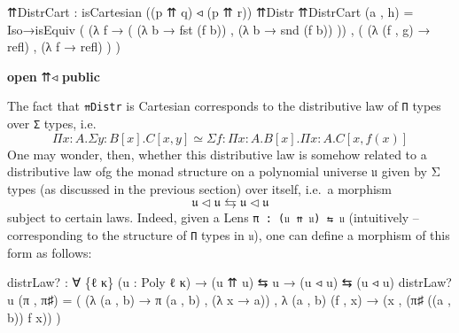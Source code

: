 \documentclass[
  11pt,
  oneside,
  article]{memoir}
\newenvironment{Shaded}{}{}
\newcommand{\KeywordTok}[1]{\textcolor[rgb]{0.00,0.44,0.13}{\textbf{#1}}}
\newcommand{\NormalTok}[1]{#1}
\newcommand{\OtherTok}[1]{\textcolor[rgb]{0.00,0.44,0.13}{#1}}
\theoremstyle{definition}
\theoremstyle{plain}
\newcommand{\0}{\textsf{0}}
\newcommand{\1}{\tn{\textsf{1}}}
\begin{document}
\begin{Shaded}
\begin{Highlighting}[]
\NormalTok{    ⇈DistrCart }\OtherTok{:}\NormalTok{ isCartesian }\OtherTok{((}\NormalTok{p ⇈ q}\OtherTok{)}\NormalTok{ ◃ }\OtherTok{(}\NormalTok{p ⇈ r}\OtherTok{))}\NormalTok{ ⇈Distr}
\NormalTok{    ⇈DistrCart }\OtherTok{(}\NormalTok{a , h}\OtherTok{)} \OtherTok{=}
\NormalTok{        Iso→isEquiv }\OtherTok{(} \OtherTok{(λ}\NormalTok{ f }\OtherTok{→} \OtherTok{(} \OtherTok{(λ}\NormalTok{ b }\OtherTok{→}\NormalTok{ fst }\OtherTok{(}\NormalTok{f b}\OtherTok{))} 
\NormalTok{                             , }\OtherTok{(λ}\NormalTok{ b }\OtherTok{→}\NormalTok{ snd }\OtherTok{(}\NormalTok{f b}\OtherTok{))} \OtherTok{))}
\NormalTok{                    , }\OtherTok{(} \OtherTok{(λ} \OtherTok{(}\NormalTok{f , g}\OtherTok{)} \OtherTok{→}\NormalTok{ refl}\OtherTok{)} 
\NormalTok{                      , }\OtherTok{(λ}\NormalTok{ f }\OtherTok{→}\NormalTok{ refl}\OtherTok{)} \OtherTok{)} \OtherTok{)}

\KeywordTok{open}\NormalTok{ ⇈◃ }\KeywordTok{public}
\end{Highlighting}
\end{Shaded}

The fact that \texttt{⇈Distr} is Cartesian corresponds to the
distributive law of \texttt{Π} types over \texttt{Σ} types, i.e.~\[
\Pi x : A . \Sigma y : B[x] . C[x,y] \simeq \Sigma f : \Pi x : A . B[x] . \Pi x : A . C[x, f(x)]
\] One may wonder, then, whether this distributive law is somehow
related to a distributive law ofg the monad structure on a polynomial
universe 𝔲 given by Σ types (as discussed in the previous section) over
itself, i.e.~a morphism
\[ \mathfrak{u} \triangleleft \mathfrak{u} \leftrightarrows \mathfrak{u} \triangleleft \mathfrak{u} \]
subject to certain laws. Indeed, given a Lens
\texttt{π\ :\ (𝔲\ ⇈\ 𝔲)\ ⇆\ 𝔲} (intuitively -- corresponding to the
structure of \texttt{Π} types in \texttt{𝔲}), one can define a morphism
of this form as follows:

\begin{Shaded}
\begin{Highlighting}[]
\NormalTok{distrLaw? }\OtherTok{:} \OtherTok{∀} \OtherTok{\{}\NormalTok{ℓ κ}\OtherTok{\}} \OtherTok{(}\NormalTok{u }\OtherTok{:}\NormalTok{ Poly ℓ κ}\OtherTok{)} \OtherTok{→} \OtherTok{(}\NormalTok{u ⇈ u}\OtherTok{)}\NormalTok{ ⇆ u}
            \OtherTok{→} \OtherTok{(}\NormalTok{u ◃ u}\OtherTok{)}\NormalTok{ ⇆ }\OtherTok{(}\NormalTok{u ◃ u}\OtherTok{)}
\NormalTok{distrLaw? u }\OtherTok{(}\NormalTok{π , π♯}\OtherTok{)} \OtherTok{=} 
    \OtherTok{(} \OtherTok{(λ} \OtherTok{(}\NormalTok{a , b}\OtherTok{)} \OtherTok{→}\NormalTok{ π }\OtherTok{(}\NormalTok{a , b}\OtherTok{)}\NormalTok{ , }\OtherTok{(λ}\NormalTok{ x }\OtherTok{→}\NormalTok{ a}\OtherTok{))} 
\NormalTok{    , }\OtherTok{λ} \OtherTok{(}\NormalTok{a , b}\OtherTok{)} \OtherTok{(}\NormalTok{f , x}\OtherTok{)} \OtherTok{→} \OtherTok{(}\NormalTok{x , }\OtherTok{(}\NormalTok{π♯ }\OtherTok{((}\NormalTok{a , b}\OtherTok{))}\NormalTok{ f x}\OtherTok{))} \OtherTok{)}
\end{Highlighting}
\end{Shaded}
\end{document}
